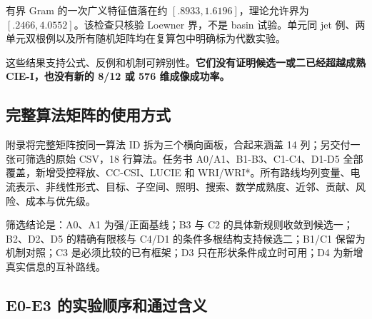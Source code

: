 \documentclass[10pt,a4paper]{article}
\begin{document}
有界 Gram 的一次广义特征值落在约 \([.8933,1.6196]\)，理论允许界为
\([.2466,4.0552]\)。该检查只核验 Loewner 界，不是 basin 试验。单元同 jet
例、两单元双根例以及所有随机矩阵均在复算包中明确标为代数实验。

这些结果支持公式、反例和机制可辨别性。\textbf{它们没有证明候选一或二已经超越成熟
CIE-I，也没有新的 8/12 或 576 维成像成功率。}

\hypertarget{ux5b8cux6574ux7b97ux6cd5ux77e9ux9635ux7684ux4f7fux7528ux65b9ux5f0f}{%
\subsection{完整算法矩阵的使用方式}\label{ux5b8cux6574ux7b97ux6cd5ux77e9ux9635ux7684ux4f7fux7528ux65b9ux5f0f}}

附录将完整矩阵按同一算法 ID 拆为三个横向面板，合起来涵盖 14
列；另交付一张可筛选的原始 CSV，18 行算法。任务书
A0/A1、B1-B3、C1-C4、D1-D5 全部覆盖，新增受控释放、CC-CSI、LUCIE 和
WRI/WRI*。所有路线均列变量、电流表示、非线性形式、目标、子空间、照明、搜索、数学成熟度、近邻、贡献、风险、成本与优先级。

筛选结论是：A0、A1 为强/正面基线；B3 与 C2
的具体新规则收敛到候选一；B2、D2、D5 的精确有限核与 C4/D1
的条件多根结构支持候选二；B1/C1 保留为机制对照；C3
是必须比较的已有框架；D3 只在形状条件成立时可用；D4
为新增真实信息的互补路线。

\hypertarget{e0-e3-ux7684ux5b9eux9a8cux987aux5e8fux548cux901aux8fc7ux542bux4e49}{%
\subsection{E0-E3
的实验顺序和通过含义}\label{e0-e3-ux7684ux5b9eux9a8cux987aux5e8fux548cux901aux8fc7ux542bux4e49}}
\end{document}

